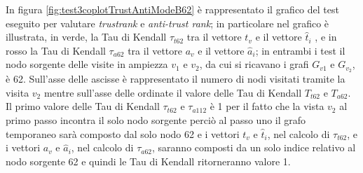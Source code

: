 In figura \ref{fig:test3coplotTrustAntiModeB62} è rappresentato il grafico del test eseguito per valutare \textit{trustrank} e \textit{anti-trust rank}; in particolare nel grafico è illustrata, in verde, la Tau di Kendall \(\tau_{t62}\) tra il vettore \(t_v\) e il vettore \(\hat{t}_i\) , e in rosso la Tau di Kendall \(\tau_{a62}\) tra il vettore \(a_v\) e il vettore \(\hat{a}_i\); in entrambi i test il nodo sorgente delle visite in ampiezza \(v_1\) e \(v_2\), da cui si ricavano i grafi \(G_{v1}\) e \(G_{v_2}\), è 62. Sull'asse delle ascisse è rappresentato il numero di nodi visitati tramite la visita \(v_2\) mentre sull'asse delle ordinate il valore delle Tau di Kendall \(T_{t62}\) e \(T_{a62}\).\\
Il primo valore delle Tau di Kendall \(\tau_{t62}\) e \(\tau_{a112}\) è 1 per il fatto che la vista \(v_2\) al primo passo  incontra il solo nodo sorgente perciò al passo uno il grafo temporaneo sarà composto dal solo nodo 62 e i vettori \(t_v\) e \(\hat{t}_i\), nel calcolo di \(\tau_{t62}\), e i vettori \(a_v\) e \(\hat{a}_i\), nel calcolo di \(\tau_{a62}\), saranno composti da un solo indice relativo al nodo sorgente 62 e quindi le Tau di Kendall ritorneranno valore 1.

